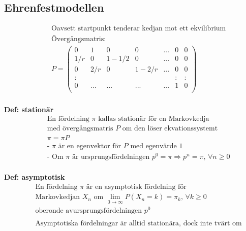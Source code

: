 \subsection{Ehrenfestmodellen}
\begin{align*}
  &\quad  \text{Oavsett startpunkt tenderar kedjan mot ett ekvilibrium} \\
  &\quad  \text{Övergångsmatris:} \\
  &\quad  P=
  \left(\begin{array}{ccccccc}
    0 & 1 & 0 & 0 & ... & 0 & 0 \\
    1/r & 0 & 1-1/2 & 0 & ... & 0 & 0 \\
    0 & 2/r & 0 & 1-2/r & ... & 0 & 0 \\
    : &  &  &  &  & : & : \\
    0 & ... & ... & ... & ... & 1 & 0 \\
  \end{array}\right) \\
\end{align*}

\textbf{Def: stationär}
\begin{align*}
  &\quad  \text{En fördelning $\pi$ kallas stationär för en Markovkedja} \\
  &\quad  \text{med övergångsmatris $P$ om den löser ekvationssystemt} \\
  &\quad  \pi=\pi P \\
  &\quad  \text{- $\pi$ är en egenvektor för $P$ med egenvärde $1$} \\
  &\quad  \text{- Om $\pi$ är ursprungsfördelningen $p^0=\pi \Rightarrow p^n=\pi, \, \forall{n}\geq0$} \\
\end{align*}

\textbf{Def: asymptotisk}
\begin{align*}
  &\quad  \text{En fördelning $\pi$ är en asymptotisk fördelning för} \\
  &\quad  \text{Markovkedjan ${X_n}$ om } \lim_{0\to\infty}P(X_n=k)=\pi_k, \, \forall{k}\geq0 \\
  &\quad  \text{oberonde avursprungsfördelningen } p^0 \\
  &\quad  \\
  &\quad  \text{Asymptotiska fördelningar är alltid stationära, dock inte tvärt om} \\
\end{align*}

